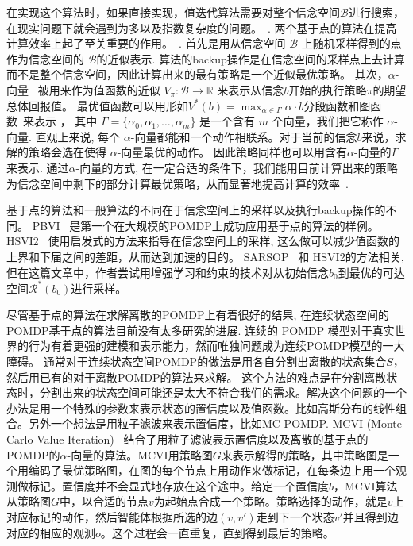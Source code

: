 \documentclass{article}
\newcommand{\reals}{\mathbb{R}}
\newcommand{\states}{S}
\newcommand{\beliefs}{\mathcal{B}}
\newcommand{\policy}{\pi}
\begin{document}
在实现这个算法时，如果直接实现，值迭代算法需要对整个信念空间$\beliefs$进行搜索，在现实问题下就会遇到为多以及指数复杂度的问题。~\cite{ASurveyofPBPOMDP}. 
两个基于点的算法在提高计算效率上起了至关重要的作用。~\cite{MCVI}. 
首先是用从信念空间 $\beliefs$ 上随机采样得到的点作为信念空间的 $\beliefs$的近似表示. 
算法的backup操作是在信念空间的采样点上去计算而不是整个信念空间，因此计算出来的最有策略是一个近似最优策略。
其次，$\alpha$-向量~\cite{sarsop} 被用来作为值函数的近似 $V_{\policy} \colon \beliefs \to \reals$ 来表示从信念$b$开始的执行策略$\policy$的期望总体回报值。
最优值函数可以用形如$
	V^{*}(b) = \max_{\alpha \in \Gamma} \alpha \cdot b
$分段函数和图函数~\cite{Sondik78}来表示
，
其中 $\Gamma = \{\alpha_{0}, \alpha_{1}, \dotsc, \alpha_{m}\}$ 是一个含有  $m$ 个向量，我们把它称作 $\alpha$-向量.
直观上来说, 每个 $\alpha$-向量都能和一个动作相联系。对于当前的信念$b$来说，求解的策略会选在使得 $\alpha$-向量最优的动作。
因此策略同样也可以用含有$\alpha$-向量的$\Gamma$来表示\cite{sarsop}.
通过$\alpha$-向量的方式, 在一定合适的条件下，我们能用目前计算出来的策略为信念空间中剩下的部分计算最优策略，从而显著地提高计算的效率~\cite{ASurveyofPBPOMDP}.

基于点的算法和一般算法的不同在于信念空间上的采样以及执行backup操作的不同。
PBVI~\cite{PBVI} 是第一个在大规模的POMDP上成功应用基于点的算法的样例。
HSVI2~\cite{PBVII} 使用启发式的方法来指导在信念空间上的采样, 这么做可以减少值函数的上界和下届之间的差距，从而达到加速的目的。
SARSOP~\cite{sarsop} 和 HSVI2的方法相关, 但在这篇文章中，作者尝试用增强学习和约束的技术对从初始信念$b_{0}$到最优的可达空间$\mathcal{R}^{*}(b_{0})$进行采样。

尽管基于点的算法在求解离散的POMDP上有着很好的结果, 在连续状态空间的POMDP基于点的算法目前没有太多研究的进展. 
连续的 POMDP 模型对于真实世界的行为有着更强的建模和表示能力，然而唯独问题成为连续POMDP模型的一大障碍。
通常对于连续状态空间POMDP的做法是用各自分割出离散的状态集合$\states$，然后用已有的对于离散POMDP的算法来求解。
这个方法的难点是在分割离散状态时，分割出来的状态空间可能还是太大不符合我们的需求。解决这个问题的一个办法是用一个特殊的参数来表示状态的置信度以及值函数。比如高斯分布的线性组合\cite{pbvic}。另外一个想法是用粒子滤波来表示置信度，比如MC-POMDP\cite{mcpomdp}. 
MCVI (Monte Carlo Value Iteration)~\cite{MCVI} 结合了用粒子滤波表示置信度以及离散的基于点的POMDP的$\alpha$-向量的算法。MCVI用策略图$G$来表示解得的策略\cite{MCVI}，其中策略图是一个用编码了最优策略图，在图的每个节点上用动作来做标记，在每条边上用一个观测做标记。置信度并不会显式地存放在这个途中。给定一个置信度$b$，MCVI算法从策略图$G$中，以合适的节点$v$为起始点合成一个策略。策略选择的动作，就是$v$上对应标记的动作，然后智能体根据所选的边$(v,v')$走到下一个状态$v'$并且得到边对应的相应的观测$o$。这个过程会一直重复，直到得到最后的策略。
\end{document}
